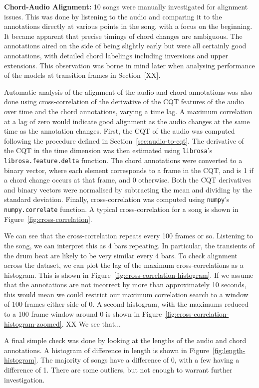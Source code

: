 \textbf{Chord-Audio Alignment:} 10 songs were manually investigated for alignment issues. This was done by listening to the audio and comparing it to the annotations directly at various points in the song, with a focus on the beginning. It became apparent that precise timings of chord changes are ambiguous. The annotations aired on the side of being slightly early but were all certainly good annotations, with detailed chord labelings including inversions and upper extensions. This observation was borne in mind later when analysing performance of the models at transition frames in Section~[XX].

Automatic analysis of the alignment of the audio and chord annotations was also done using cross-correlation of the derivative of the CQT features of the audio over time and the chord annotations, varying a time lag. A maximum correlation at a lag of zero would indicate good alignment as the audio changes at the same time as the annotation changes. First, the CQT of the audio was computed following the procedure defined in Section~\ref{sec:audio-to-cqt}. The derivative of the CQT in the time dimension was then estimated using \texttt{librosa}'s \texttt{librosa.feature.delta} function. The chord annotations were converted to a binary vector, where each element corresponds to a frame in the CQT, and is 1 if a chord change occurs at that frame, and 0 otherwise. Both the CQT derivatives and binary vectors were normalised by subtracting the mean and dividing by the standard deviation. Finally, cross-correlation was computed using \texttt{numpy}'s \texttt{numpy.correlate} function. A typical cross-correlation for a song is shown in Figure~\ref{fig:cross-correlation}.

We can see that the cross-correlation repeats every 100 frames or so. Listening to the song, we can interpret this as 4 bars repeating. In particular, the transients of the drum beat are likely to be very similar every 4 bars. To check alignment across the dataset, we can plot the lag of the maximum cross-correlations as a histogram. This is shown in Figure~\ref{fig:cross-correlation-histogram}. If we assume that the annotations are not incorrect by more than approximately 10 seconds, this would mean we could restrict our maximum correlation search to a window of 100 frames either side of 0. A second histogram, with the maximums reduced to a 100 frame window around 0 is shown in Figure~\ref{fig:cross-correlation-histogram-zoomed}. XX We see that...

A final simple check was done by looking at the lengths of the audio and chord annotations. A histogram of difference in length is shown in Figure~\ref{fig:length-histogram}. The majority of songs have a difference of 0, with a few having a difference of 1. There are some outliers, but not enough to warrant further investigation.

